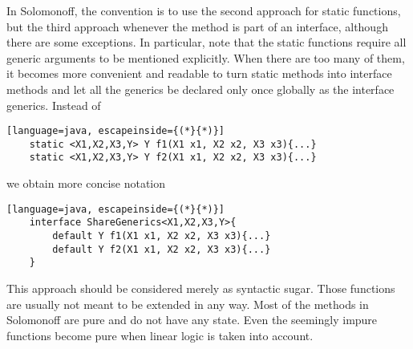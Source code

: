 In Solomonoff, the convention is to use the second approach for static functions, but the third approach whenever the method is part of an interface, although there are some exceptions. In particular, note that the static functions require all generic arguments to be mentioned explicitly. When there are too many of them, it becomes more convenient and readable to turn static methods into interface methods and let all the generics be declared only once globally as the interface generics. Instead of
\begin{lstlisting}[language=java, escapeinside={(*}{*)}]
	static <X1,X2,X3,Y> Y f1(X1 x1, X2 x2, X3 x3){...}
	static <X1,X2,X3,Y> Y f2(X1 x1, X2 x2, X3 x3){...}
\end{lstlisting}
we obtain more concise notation
\begin{lstlisting}[language=java, escapeinside={(*}{*)}]
	interface ShareGenerics<X1,X2,X3,Y>{
		default Y f1(X1 x1, X2 x2, X3 x3){...}
		default Y f2(X1 x1, X2 x2, X3 x3){...}
	}
\end{lstlisting}
This approach should be considered merely as syntactic sugar. Those functions are usually not meant to be extended in any way. Most of the methods in Solomonoff are pure and do not have any state. Even the seemingly impure functions become pure when linear logic is taken into account. 







